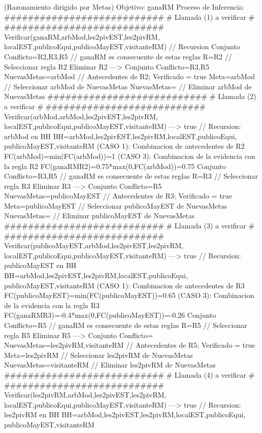 \begin{listing}[language=Pascal]
(Razonamiento dirigido por Metas)
Objetivo: ganaRM
Proceso de Inferencia: 
  ###########################
  # Llamada (1) a verificar #
  ###########################
	Verificar(ganaRM,{arbMod,les2pivEST,les2pivRM, localEST,publicoEqui,publicoMayEST,visitanteRM}) // Recursion 
	Conjunto Conflicto={R2,R3,R5} // ganaRM es consecuente de estas reglas
	R={R2} // Seleccionar regla R2
	Eliminar R2 ---> Conjunto Conflicto={R3,R5}
	NuevasMetas={arbMod} // Antecedentes de R2; Verificado = true
	Meta=arbMod // Seleccionar arbMod de NuevasMetas
	NuevasMetas={} // Eliminar arbMod de NuevasMetas
  ###########################
  # Llamada (2) a verificar #
  ###########################
	Verificar(arbMod,{arbMod,les2pivEST,les2pivRM, localEST,publicoEqui,publicoMayEST,visitanteRM}) ---> true // Recursion: arbMod en BH
	BH={arbMod,les2pivEST,les2pivRM,localEST,publicoEqui, publicoMayEST,visitanteRM}
	(CASO 1): Combinacion de antecedentes de R2
	 FC(arbMod)=min(FC(arbMod))=1
	(CASO 3): Combinacion de la evidencia con la regla R2
	 FC(ganaRM{R2})=0.75*max(0,FC(arbMod))=0.75
	Conjunto Conflicto={R3,R5} // ganaRM es consecuente de estas reglas
	R={R3} // Seleccionar regla R3
	Eliminar R3 ---> Conjunto Conflicto={R5}
	NuevasMetas={publicoMayEST} // Antecedentes de R3; Verificado = true
	Meta=publicoMayEST // Seleccionar publicoMayEST de NuevasMetas
	NuevasMetas={} // Eliminar publicoMayEST de NuevasMetas
  ###########################
  # Llamada (3) a verificar #
  ###########################
	Verificar(publicoMayEST,{arbMod,les2pivEST,les2pivRM, localEST,publicoEqui,publicoMayEST,visitanteRM}) ---> true // Recursion: publicoMayEST en BH
	BH={arbMod,les2pivEST,les2pivRM,localEST,publicoEqui, publicoMayEST,visitanteRM}
	(CASO 1): Combinacion de antecedentes de R3
	 FC(publicoMayEST)=min(FC(publicoMayEST))=0.65
	(CASO 3): Combinacion de la evidencia con la regla R3
	 FC(ganaRM{R3})=-0.4*max(0,FC(publicoMayEST))=-0.26
	Conjunto Conflicto={R5} // ganaRM es consecuente de estas reglas
	R={R5} // Seleccionar regla R5
	Eliminar R5 ---> Conjunto Conflicto={}
	NuevasMetas={les2pivRM,visitanteRM} // Antecedentes de R5; Verificado = true
	Meta=les2pivRM // Seleccionar les2pivRM de NuevasMetas
	NuevasMetas={visitanteRM} // Eliminar les2pivRM de NuevasMetas
  ###########################
  # Llamada (4) a verificar #
  ###########################
	Verificar(les2pivRM,{arbMod,les2pivEST,les2pivRM, localEST,publicoEqui,publicoMayEST,visitanteRM}) ---> true // Recursion: les2pivRM en BH
	BH={arbMod,les2pivEST,les2pivRM,localEST,publicoEqui, publicoMayEST,visitanteRM}

\end{listing}
